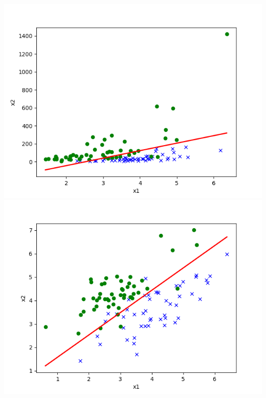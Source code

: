 \begin{answer}\\
    \includegraphics[scale = 0.7]{../src/output/p01b_pred_1.png}\\
    \includegraphics[scale = 0.7]{../src/output/p01b_pred_2.png}
\end{answer}
